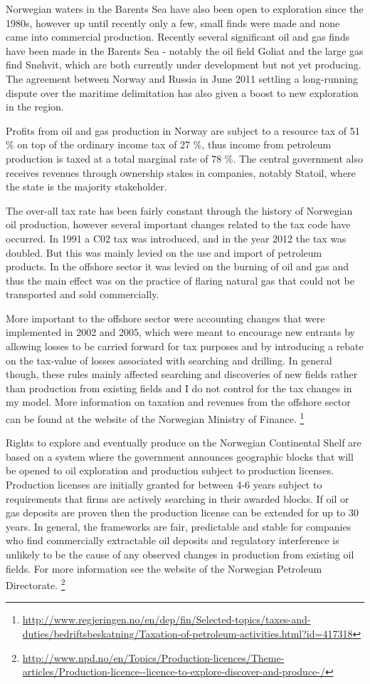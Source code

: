 \documentclass[11pt]{article}
\begin{document}
Norwegian waters in the Barents Sea have also been open to exploration since the 1980s, however up until recently only a few, small finds were made and none came into commercial production.  Recently several significant oil and gas finds have been made in the Barents Sea - notably the oil field Goliat and the large gas find Sn\o hvit, which are both currently under development but not yet producing.  The agreement between Norway and Russia in June 2011 settling a long-running dispute over the maritime delimitation has also given a boost to new exploration in the region.  

Profits from oil and gas production in Norway are subject to a resource tax of 51 \% on top of the ordinary income tax of 27 \%, thus income from petroleum production is taxed at a total marginal rate of 78 \%.  The central government also receives revenues through ownership stakes in companies, notably Statoil, where the state is the majority stakeholder. 

The over-all tax rate has been fairly constant through the history of Norwegian oil production, however several important changes related to the tax code have occurred.  In 1991 a C02 tax was introduced, and in the year 2012 the tax was doubled.  But this was mainly levied on the use and import of petroleum products.  In the offshore sector it was levied on the burning of oil and gas and thus the main effect was on the practice of flaring natural gas that could not be transported and sold commercially.

More important to the offshore sector were accounting changes that were implemented in 2002 and 2005, which were meant to encourage new entrants by allowing losses to be carried forward for tax purposes and by introducing a rebate on the tax-value of losses associated with searching and drilling.  In general though, these rules mainly affected searching and discoveries of new fields rather than production from existing fields and I do not control for the tax changes in my model.  More information on taxation and revenues from the offshore sector can be found at the website of the Norwegian Ministry of Finance. \footnote{\url{http://www.regjeringen.no/en/dep/fin/Selected-topics/taxes-and-duties/bedriftsbeskatning/Taxation-of-petroleum-activities.html?id=417318}}

Rights to explore and eventually produce on the Norwegian Continental Shelf are based on a system where the government announces geographic blocks that will be opened to oil exploration and production subject to production licenses.  Production licenses are initially granted for between 4-6 years subject to requirements that firms are actively searching in their awarded blocks.  If oil or gas deposits are proven then the production license can be extended for up to 30 years.  In general, the frameworks are fair, predictable and stable for companies who find commercially extractable oil deposits and regulatory interference is unlikely to be the cause of any observed changes in production from existing oil fields.  For more information see the website of the Norwegian Petroleum Directorate. \footnote{\url{http://www.npd.no/en/Topics/Production-licences/Theme-articles/Production-licence--licence-to-explore-discover-and-produce-/}}
\end{document}

